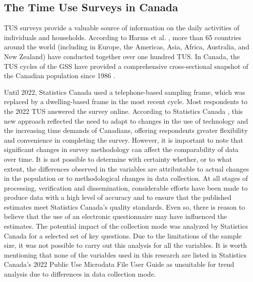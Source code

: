 \documentclass[preprint, 3p,
authoryear]{elsarticle} %
\begin{document}
\subsection{The Time Use Surveys in
Canada}\label{the-time-use-surveys-in-canada}

TUS surveys provide a valuable source of information on the daily
activities of individuals and households. According to Harms et al.
\citeyearpar{harms2018}, more than 65 countries around the world
(including in Europe, the Americas, Asia, Africa, Australia, and New
Zealand) have conducted together over one hundred TUS. In Canada, the
TUS cycles of the GSS have provided a comprehensive cross-sectional
snapshot of the Canadian population since 1986
\citep{statisticscanada2022}.

Until 2022, Statistics Canada used a telephone-based sampling frame,
which was replaced by a dwelling-based frame in the most recent cycle.
Most respondents to the 2022 TUS answered the survey online. According
to Statistics Canada \citeyearpar{statisticscanada2022}, this new
approach reflected the need to adapt to changes in the use of technology
and the increasing time demands of Canadians, offering respondents
greater flexibility and convenience in completing the survey. However,
it is important to note that significant changes in survey methodology
can affect the comparability of data over time. It is not possible to
determine with certainty whether, or to what extent, the differences
observed in the variables are attributable to actual changes in the
population or to methodological changes in data collection. At all
stages of processing, verification and dissemination, considerable
efforts have been made to produce data with a high level of accuracy and
to ensure that the published estimates meet Statistics Canada's quality
standards. Even so, there is reason to believe that the use of an
electronic questionnaire may have influenced the estimates. The
potential impact of the collection mode was analyzed by Statistics
Canada for a selected set of key questions. Due to the limitations of
the sample size, it was not possible to carry out this analysis for all
the variables. It is worth mentioning that none of the variables used in
this research are listed in Statistics Canada's 2022 Public Use
Microdata File User Guide \citep{statisticscanada2022} as unsuitable for
trend analysis due to differences in data collection mode.
\end{document}
